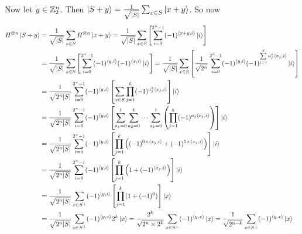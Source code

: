 \documentclass[a4paper, 11pt]{article}
\begin{document}
{	Now let $y\in \mathbb{Z}_2^n$. Then $\ket{S+y}=\frac1{\sqrt{|S|}}\sum_{x\in S}\ket{x+y}$. So now
	\begin{align*}
		H^{\otimes n}\ket{S+y} & =\frac1{\sqrt{|S|}}\sum_{x\in S}H^{\otimes n}\ket{x+y}  =\frac1{\sqrt{|S|}}\sum_{x\in S}\left[\sum_{i=0}^{2^n-1}(-1)^{\langle x+y,i\rangle}\ket{i}  \right]                                                                              \\
		                       & =\frac1{\sqrt{|S|}}\sum_{x\in S}\left[\sum_{i=0}^{2^n-1}(-1)^{\langle y,i\rangle}(-1)^{\langle x,i\rangle}\ket{i}  \right]   =\frac1{\sqrt{|S|}}\sum_{x\in S}\left[\frac{1}{\sqrt{2^n}} \sum_{i=0}^{2^n-1}(-1)^{\langle y,i\rangle} (-1)^{\sum\limits_{j=1}^ka_j^x\langle x_j,i\rangle}\ket{i} \right]                                                                        \\
		                       & =\frac1{\sqrt{2^n|S|}}\sum_{i=0}^{2^n-1}(-1)^{\langle y,i\rangle}\left[ \sum_{x\in S}\prod_{j=1}^k(-1)^{a_j^x\langle x_j,i\rangle} \right]\ket{i}                                                                                                \\
		                       & =\frac1{\sqrt{2^n|S|}}\sum_{i=0}^{2^n-1}(-1)^{\langle y,i\rangle}\left[ \sum_{a_1=0}^1 \sum_{a_2=0}^1\cdots \sum_{a_k=0}^1 \left(\prod_{j=1}^k(-1)^{a_j\langle x_j,i\rangle} \right)\right]\ket{i}                                                    \\
		                       & =\frac1{\sqrt{2^n|S|}}\sum_{i=0}^{2^n-1} (-1)^{\langle y,i\rangle}\left[\prod_{j=1}^k \left((-1)^{0\times \langle x_j,i\rangle}+(-1)^{1\times \langle x_j,i\rangle}\right)  \right]\ket{i}                                                                    \\
		                       & =\frac1{\sqrt{2^n|S|}}\sum_{i=0}^{2^n-1} (-1)^{\langle y,i\rangle}\left[\prod_{j=1}^k \left(1+(-1)^{ \langle x_j,i\rangle}\right)  \right]\ket{i}                                                                                                     \\
		                       & =\frac1{\sqrt{2^n|S|}}\sum_{x\in S^{\perp}}(-1)^{\langle y,i\rangle} \left[ \prod_{j=1}^k (1+(-1)^0) \right]\ket{x}                                                                                                                      \\
		                       & =\frac1{\sqrt{2^n|S|}}\sum_{x\in S^{\perp}}(-1)^{\langle y,x\rangle}2^k\ket{x}   =\frac{2^k}{\sqrt{2^n\times 2^k}}\sum_{x\in S^{\perp}}(-1)^{\langle y,x\rangle}\ket{x}=\frac1{\sqrt{2^{n-k}}}\sum_{x\in S^{\perp}}(-1)^{\langle y,x\rangle}\ket{x}
	\end{align*}
}

	
\end{document}
